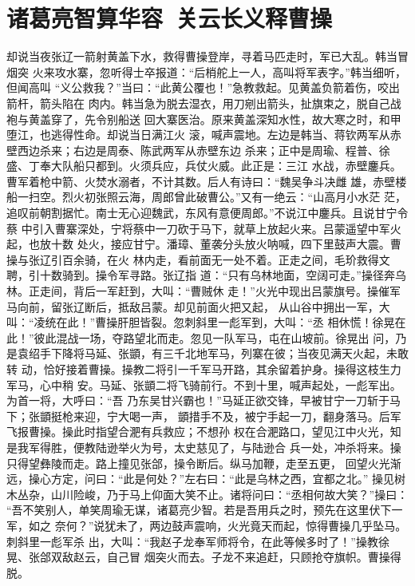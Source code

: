 \chapter{诸葛亮智算华容~关云长义释曹操}

却说当夜张辽一箭射黄盖下水，救得曹操登岸，寻着马匹走时，军已大乱。韩当冒烟突
火来攻水寨，忽听得士卒报道：“后梢舵上一人，高叫将军表字。”韩当细听，但闻高叫
“义公救我？”当曰：“此黄公覆也！”急教救起。见黄盖负箭着伤，咬出箭杆，箭头陷在
肉内。韩当急为脱去湿衣，用刀剜出箭头，扯旗束之，脱自己战袍与黄盖穿了，先令别船送
回大寨医治。原来黄盖深知水性，故大寒之时，和甲堕江，也逃得性命。却说当日满江火
滚，喊声震地。左边是韩当、蒋钦两军从赤壁西边杀来；右边是周泰、陈武两军从赤壁东边
杀来；正中是周瑜、程普、徐盛、丁奉大队船只都到。火须兵应，兵仗火威。此正是：三江
水战，赤壁鏖兵。曹军着枪中箭、火焚水溺者，不计其数。后人有诗曰：“魏吴争斗决雌
雄，赤壁楼船一扫空。烈火初张照云海，周郎曾此破曹公。”又有一绝云：“山高月小水茫
茫，追叹前朝割据忙。南士无心迎魏武，东风有意便周郎。”不说江中鏖兵。且说甘宁令蔡
中引入曹寨深处，宁将蔡中一刀砍于马下，就草上放起火来。吕蒙遥望中军火起，也放十数
处火，接应甘宁。潘璋、董袭分头放火呐喊，四下里鼓声大震。曹操与张辽引百余骑，在火
林内走，看前面无一处不着。正走之间，毛玠救得文聘，引十数骑到。操令军寻路。张辽指
道：“只有乌林地面，空阔可走。”操径奔乌林。正走间，背后一军赶到，大叫：“曹贼休
走！”火光中现出吕蒙旗号。操催军马向前，留张辽断后，抵敌吕蒙。却见前面火把又起，
从山谷中拥出一军，大叫：“凌统在此！”曹操肝胆皆裂。忽刺斜里一彪军到，大叫：“丞
相休慌！徐晃在此！”彼此混战一场，夺路望北而走。忽见一队军马，屯在山坡前。徐晃出
问，乃是袁绍手下降将马延、张顗，有三千北地军马，列寨在彼；当夜见满天火起，未敢转
动，恰好接着曹操。操教二将引一千军马开路，其余留着护身。操得这枝生力军马，心中稍
安。马延、张顗二将飞骑前行。不到十里，喊声起处，一彪军出。为首一将，大呼曰：“吾
乃东吴甘兴霸也！”马延正欲交锋，早被甘宁一刀斩于马下；张顗挺枪来迎，宁大喝一声，
顗措手不及，被宁手起一刀，翻身落马。后军飞报曹操。操此时指望合淝有兵救应；不想孙
权在合淝路口，望见江中火光，知是我军得胜，便教陆逊举火为号，太史慈见了，与陆逊合
兵一处，冲杀将来。操只得望彝陵而走。路上撞见张郃，操令断后。纵马加鞭，走至五更，
回望火光渐远，操心方定，问曰：“此是何处？”左右曰：“此是乌林之西，宜都之北。”
操见树木丛杂，山川险峻，乃于马上仰面大笑不止。诸将问曰：“丞相何故大笑？”操曰：
“吾不笑别人，单笑周瑜无谋，诸葛亮少智。若是吾用兵之时，预先在这里伏下一军，如之
奈何？”说犹未了，两边鼓声震响，火光竟天而起，惊得曹操几乎坠马。刺斜里一彪军杀
出，大叫：“我赵子龙奉军师将令，在此等候多时了！”操教徐晃、张郃双敌赵云，自己冒
烟突火而去。子龙不来追赶，只顾抢夺旗帜。曹操得脱。

